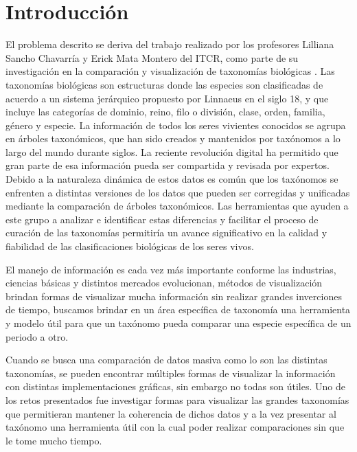 \documentclass[journal]{IEEEtran}
\begin{document}
\section{Introducción}
% 
% 
% 
% 
El problema descrito se deriva del trabajo realizado por los profesores Lilliana 
Sancho Chavarría y Erick Mata Montero del ITCR, como parte  de su  investigación en la comparación
y visualización de taxonomías biológicas \cite{sancho_diafora}.
Las taxonomías biológicas son estructuras donde las especies son clasificadas de
 acuerdo a un sistema jerárquico propuesto por Linnaeus en el siglo 18\cite{linne},
  y que incluye las categorías de dominio, reino, filo o división, clase, orden,
   familia, género y especie.
La información de todos los seres vivientes conocidos se agrupa en
 árboles taxonómicos, que han sido creados y mantenidos por taxónomos a lo largo 
 del mundo durante siglos. La reciente revolución digital ha permitido que gran parte 
 de esa información pueda  ser compartida y revisada por expertos.  
 Debido a la naturaleza dinámica de estos datos es común que los taxónomos se 
 enfrenten a distintas versiones de los datos que pueden ser corregidas y unificadas
  mediante la comparación de árboles taxonómicos. Las herramientas que ayuden a este 
  grupo a analizar e identificar estas diferencias y facilitar el proceso de curación 
  de las taxonomías permitiría un avance significativo en la calidad y fiabilidad de
   las clasificaciones biológicas de los seres vivos.
   
El manejo de información es cada vez más importante conforme las industrias, ciencias básicas y distintos mercados evolucionan, métodos de visualización brindan formas de visualizar mucha información sin realizar grandes inverciones de tiempo, buscamos brindar en un área específica de taxonomía una herramienta y modelo útil para que un taxónomo pueda comparar una especie específica de un periodo a otro.  
   
Cuando se busca una comparación de datos masiva como lo son las distintas taxonomías, se pueden encontrar múltiples formas de visualizar la información con distintas implementaciones gráficas, sin embargo no todas son útiles. Uno de los retos presentados fue investigar formas para visualizar las grandes taxonomías que permitieran mantener la coherencia de dichos datos y a la vez presentar al taxónomo una herramienta útil con la cual poder realizar comparaciones sin que le tome mucho tiempo.
\end{document}
